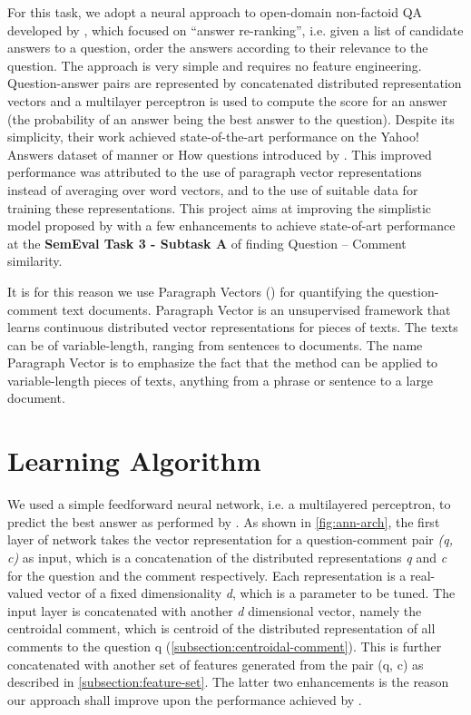 \documentclass[12pt, a4paper, oneside]{Thesis} %
\begin{document}
For this task, we adopt a neural approach to open-domain non-factoid QA developed by \cite{bogdanova2016we}, which focused on “answer re-ranking”, i.e. given a list of candidate answers to a question, order the answers according to their relevance to the question. The approach is very simple and requires no feature engineering. Question-answer pairs are represented by concatenated distributed representation vectors and a multilayer perceptron is used to compute the score for an answer (the probability of an answer being the best answer to the question). Despite its simplicity, their work achieved state-of-the-art performance on the Yahoo! Answers dataset of manner or How questions introduced by \cite{jansen2014discourse}. This improved performance was attributed to the use of paragraph vector representations instead of averaging over word vectors, and to the use of suitable data for training these representations. This project aims at improving the simplistic model proposed by \cite{bogdanova2016we} with a few enhancements to achieve state-of-art performance at the \textbf{SemEval Task 3 - Subtask A} of finding Question -- Comment similarity.

It is for this reason we use Paragraph Vectors (\cite{le2014distributed}) for quantifying the question-comment text documents. Paragraph Vector is an unsupervised framework that learns continuous distributed vector representations for pieces of texts. The texts can be of variable-length, ranging from sentences to documents. The name Paragraph Vector is to emphasize the fact that the method can be applied to variable-length pieces of texts, anything from a phrase or sentence to a large document.

\section{Learning Algorithm}
\label{section:learning-algo}

We used a simple feedforward neural network, i.e. a multilayered perceptron, to predict the best answer as performed by \cite{bogdanova2016we}. As shown in \autoref{fig:ann-arch}, the first layer of network takes the vector representation for a question-comment pair \textit{(q, c)} as input, which is a concatenation of the distributed representations \textit{q} and \textit{c} for the question and the comment respectively. Each representation is a real-valued vector of a fixed dimensionality \textit{d}, which is a parameter to be tuned. The input layer is concatenated with another \textit{d} dimensional vector, namely the centroidal comment, which is centroid of the distributed representation of all comments to the question q (\autoref{subsection:centroidal-comment}). This is further concatenated with another set of features generated from the pair (q, c) as described in \autoref{subsection:feature-set}. The latter two enhancements is the reason our approach shall improve upon the performance achieved by \cite{bogdanova2016we}.
\end{document}
